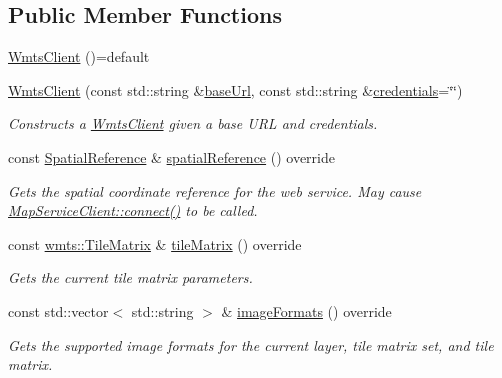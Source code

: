 \subsection*{Public Member Functions}
\begin{DoxyCompactItemize}
\item 
\hyperlink{classdg_1_1deepcore_1_1imagery_1_1_wmts_client_a408ab2e9f51053db6d0fbf1074567851}{Wmts\+Client} ()=default
\item 
\hyperlink{classdg_1_1deepcore_1_1imagery_1_1_wmts_client_a7795f68322e43cc9485d541f70caea1c}{Wmts\+Client} (const std\+::string \&\hyperlink{group___imagery_module_gadf279770cec6dc9ac56348bb2e1b29e1}{base\+Url}, const std\+::string \&\hyperlink{group___imagery_module_gac4c03ea635c336ca2fe7de533706c11c}{credentials}=\char`\"{}\char`\"{})
\begin{DoxyCompactList}\small\item\em Constructs a \hyperlink{classdg_1_1deepcore_1_1imagery_1_1_wmts_client}{Wmts\+Client} given a base U\+RL and credentials. \end{DoxyCompactList}\item 
const \hyperlink{classdg_1_1deepcore_1_1imagery_1_1_spatial_reference}{Spatial\+Reference} \& \hyperlink{classdg_1_1deepcore_1_1imagery_1_1_wmts_client_a9aa6eb184d4769e1c7b4242ecf4f3d8d}{spatial\+Reference} () override
\begin{DoxyCompactList}\small\item\em Gets the spatial coordinate reference for the web service. May cause \hyperlink{group___imagery_module_ga5e5f58c725cafba7966936f688a6ade0}{Map\+Service\+Client\+::connect()} to be called. \end{DoxyCompactList}\item 
const \hyperlink{structdg_1_1deepcore_1_1imagery_1_1wmts_1_1_tile_matrix}{wmts\+::\+Tile\+Matrix} \& \hyperlink{classdg_1_1deepcore_1_1imagery_1_1_wmts_client_a9d4a95bddb0537f61815b3d48a9363af}{tile\+Matrix} () override
\begin{DoxyCompactList}\small\item\em Gets the current tile matrix parameters. \end{DoxyCompactList}\item 
const std\+::vector$<$ std\+::string $>$ \& \hyperlink{classdg_1_1deepcore_1_1imagery_1_1_wmts_client_a89f67fe90aa2275e8a4ea34397e450a5}{image\+Formats} () override
\begin{DoxyCompactList}\small\item\em Gets the supported image formats for the current layer, tile matrix set, and tile matrix. \end{DoxyCompactList}\item 

\end{DoxyCompactItemize}

